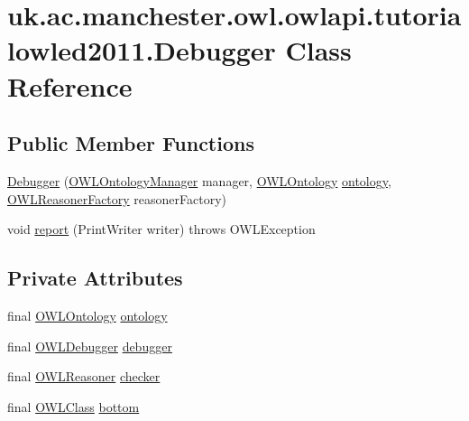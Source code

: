 \hypertarget{classuk_1_1ac_1_1manchester_1_1owl_1_1owlapi_1_1tutorialowled2011_1_1_debugger}{\section{uk.\-ac.\-manchester.\-owl.\-owlapi.\-tutorialowled2011.\-Debugger Class Reference}
\label{classuk_1_1ac_1_1manchester_1_1owl_1_1owlapi_1_1tutorialowled2011_1_1_debugger}
}
\subsection*{Public Member Functions}
\begin{DoxyCompactItemize}
\item 
\hyperlink{classuk_1_1ac_1_1manchester_1_1owl_1_1owlapi_1_1tutorialowled2011_1_1_debugger_a0d8767f1ba0c5193d0a7ae887a5388f4}{Debugger} (\hyperlink{interfaceorg_1_1semanticweb_1_1owlapi_1_1model_1_1_o_w_l_ontology_manager}{O\-W\-L\-Ontology\-Manager} manager, \hyperlink{interfaceorg_1_1semanticweb_1_1owlapi_1_1model_1_1_o_w_l_ontology}{O\-W\-L\-Ontology} \hyperlink{classuk_1_1ac_1_1manchester_1_1owl_1_1owlapi_1_1tutorialowled2011_1_1_debugger_a7539a89ed305bb3dde091f3bd816da63}{ontology}, \hyperlink{interfaceorg_1_1semanticweb_1_1owlapi_1_1reasoner_1_1_o_w_l_reasoner_factory}{O\-W\-L\-Reasoner\-Factory} reasoner\-Factory)
\item 
void \hyperlink{classuk_1_1ac_1_1manchester_1_1owl_1_1owlapi_1_1tutorialowled2011_1_1_debugger_ae8e07466c55e8d12926bb0390b6e0c55}{report} (Print\-Writer writer)  throws O\-W\-L\-Exception 
\end{DoxyCompactItemize}
\subsection*{Private Attributes}
\begin{DoxyCompactItemize}
\item 
final \hyperlink{interfaceorg_1_1semanticweb_1_1owlapi_1_1model_1_1_o_w_l_ontology}{O\-W\-L\-Ontology} \hyperlink{classuk_1_1ac_1_1manchester_1_1owl_1_1owlapi_1_1tutorialowled2011_1_1_debugger_a7539a89ed305bb3dde091f3bd816da63}{ontology}
\item 
final \hyperlink{interfaceorg_1_1semanticweb_1_1owlapi_1_1debugging_1_1_o_w_l_debugger}{O\-W\-L\-Debugger} \hyperlink{classuk_1_1ac_1_1manchester_1_1owl_1_1owlapi_1_1tutorialowled2011_1_1_debugger_a9a5bd783d630dbdeb3159599a6e6bc0d}{debugger}
\item 
final \hyperlink{interfaceorg_1_1semanticweb_1_1owlapi_1_1reasoner_1_1_o_w_l_reasoner}{O\-W\-L\-Reasoner} \hyperlink{classuk_1_1ac_1_1manchester_1_1owl_1_1owlapi_1_1tutorialowled2011_1_1_debugger_a50711c5bcc752e81da471ed050802ba4}{checker}
\item 
final \hyperlink{interfaceorg_1_1semanticweb_1_1owlapi_1_1model_1_1_o_w_l_class}{O\-W\-L\-Class} \hyperlink{classuk_1_1ac_1_1manchester_1_1owl_1_1owlapi_1_1tutorialowled2011_1_1_debugger_a88740d2553b49d4a1b586de381528746}{bottom}
\end{DoxyCompactItemize}


